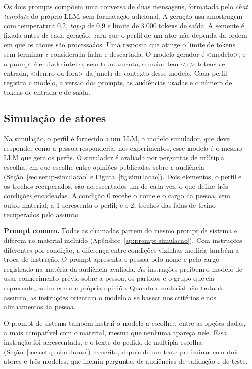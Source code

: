 Os dois prompts compõem uma conversa de duas mensagens, formatada pelo \textit{chat template} do
próprio LLM, sem formatação adicional. A geração usa amostragem com temperatura 0,2, \textit{top-p}
de 0,9 e limite de 3.000 tokens de saída. A semente é fixada antes de cada geração, para que o perfil
de um ator não dependa da ordem em que os atores são processados. Uma resposta que atinge o limite de
tokens sem terminar é considerada falha e descartada. O modelo gerador é <modelo>, e o prompt é
enviado inteiro, sem truncamento; o maior tem <n> tokens de entrada, <dentro ou fora> da janela de
contexto desse modelo. Cada perfil registra o modelo, a versão dos prompts, as audiências usadas e o
número de tokens de entrada e de saída.


\subsection{Simulação de atores}
\label{sec:metodo-simulacao}

Na simulação, o perfil é fornecido a um LLM, o modelo simulador, que deve responder como a pessoa
responderia; nos experimentos, esse modelo é o mesmo LLM que gera os perfis. O simulador é avaliado
por perguntas de múltipla escolha, em que escolhe entre opiniões publicadas sobre a audiência
(Seção~\ref{sec:setup-simulacao} e Figura~\ref{fig:simulacao}). Dois elementos, o perfil e os trechos recuperados, são
acrescentados um de cada vez, o que define três condições encadeadas. A condição 0 recebe o nome e o
cargo da pessoa, sem outro material; a 1 acrescenta o perfil; e a 2, trechos das falas de treino
recuperados pelo assunto.

\textbf{Prompt comum.} Todas as chamadas partem do mesmo prompt de sistema e diferem no material
incluído (Apêndice~\ref{ap:prompt-simulacao}). Com instruções diferentes por condição, a diferença
entre condições vizinhas mediria também a troca de instrução. O prompt apresenta a pessoa pelo nome
e pelo cargo registrado na matéria da audiência avaliada. As instruções proíbem o modelo de usar
conhecimento prévio sobre a pessoa, os partidos e o grupo que ela representa, assim como a própria
opinião. Quando o material não trata do assunto, as instruções orientam o modelo a se basear nos
critérios e nos alinhamentos da pessoa.

O prompt de sistema também instrui o modelo a escolher, entre as opções dadas, a mais compatível com
o material, mesmo que nenhuma apareça nele. Essa instrução foi acrescentada, e o texto do pedido de
múltipla escolha (Seção~\ref{sec:setup-simulacao}) reescrito, depois de um teste preliminar com dois
atores e três modelos, que incluiu perguntas de audiências de validação e de teste.

